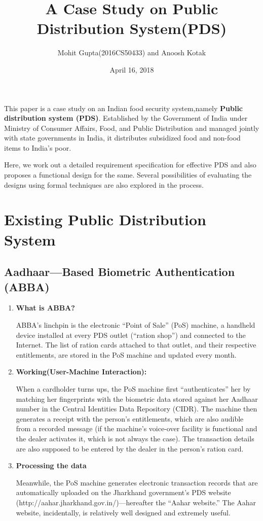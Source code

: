 \documentclass[12pt]{article}
\title{A Case Study on Public Distribution System(PDS)}
\author{Mohit Gupta(2016CS50433) and Anoosh Kotak }
\date{April 16, 2018}
\begin{document}
\maketitle


 This paper is a case study on an Indian food security system,namely \textbf{Public distribution system (PDS)}. Established by the Government of India under Ministry of Consumer Affairs, Food, and Public Distribution and managed jointly with state governments in India, it distributes subsidized food and non-food items to India's poor. 
 
 Here, we work out a detailed requirement specification for effective PDS and also proposes a functional design for the same.
Several possibilities of evaluating the designs using formal techniques are also explored in the process.


\section{Existing Public Distribution System}
\subsection{Aadhaar—Based Biometric Authentication (ABBA)}
\begin{enumerate}
    \item \textbf{What is ABBA?} 
    
    ABBA’s linchpin is the electronic “Point of Sale” (PoS) machine, a handheld device installed at every PDS outlet (“ration shop”) and connected to the Internet. The list of ration cards attached to that outlet, and their respective entitlements, are stored in the PoS machine and updated every month. 
    \item \textbf{Working(User-Machine Interaction):}
    
    When a cardholder turns ups, the PoS machine first “authenticates” her by matching her fingerprints with the biometric data stored against her Aadhaar number in the Central Identities Data Repository (CIDR). The machine then generates a receipt with the person’s entitlements, which are also audible from a recorded message (if the machine’s voice-over facility is functional and the dealer activates it, which is not always the case). The transaction details are also supposed to be entered by the dealer in the person’s ration card.
    
    \item \textbf{Processing the data}
    
    Meanwhile, the PoS machine generates electronic transaction records that are automatically uploaded on the Jharkhand government’s PDS website (http://aahar.jharkhand.gov.in/)—hereafter the “Aahar website.” The Aahar website, incidentally, is relatively well designed and extremely useful.
\end{enumerate}
\end{document}
